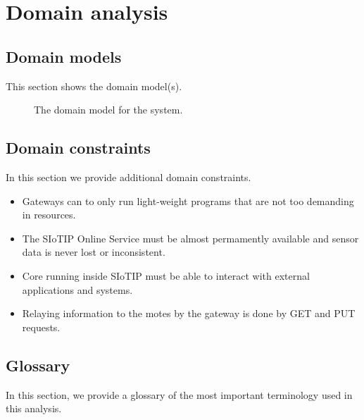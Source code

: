 \documentclass[english]{sareport}
\begin{document}
\maketitle

\tableofcontents

\chapter{Domain analysis}\label{sec:domain}
\section{Domain models}
This section shows the domain model(s).

\begin{figure}[!htp]
    \centering
    \caption{The domain model for the system.}\label{fig:domain_model}
\end{figure}

\section{Domain constraints}
In this section we provide additional domain constraints.

\begin{itemize}
    \item Gateways can to only run light-weight programs that are not too
          demanding in resources.
    \item The SIoTIP Online Service must be almost permamently available and sensor
          data is never lost or inconsistent.
    \item Core running inside SIoTIP must be able to interact with
          external applications and systems.
    \item Relaying information to the motes by the gateway is done by GET and PUT
          requests.
\end{itemize}

\section{Glossary}
In this section, we provide a glossary of the most important terminology used
in this analysis.
\end{document}
